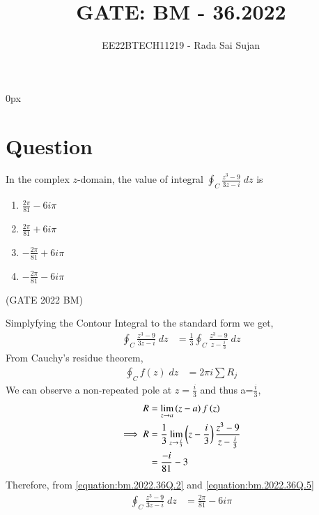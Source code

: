 \documentclass[journal,12pt,twocolumn]{IEEEtran}
\theoremstyle{remark}
\begin{document}
\parindent 0px

\title{GATE: BM - 36.2022}
\author{EE22BTECH11219 - Rada Sai Sujan$^{}$%
}
\maketitle
\newpage
\bigskip
\section*{Question}
In the complex $z$-domain, the value of integral $\oint_{C}\frac{z^3-9}{3z-i}\;dz$ is   \\
\begin{enumerate}[label=(\alph*)]
    \item $\frac{2\pi}{81}-6i\pi$ 
    \item $\frac{2\pi}{81}+6i\pi$ 
    \item $-\frac{2\pi}{81}+6i\pi$ 
    \item $-\frac{2\pi}{81}-6i\pi$ 
\end{enumerate} \hfill(GATE 2022 BM)    \\
\solution

Simplyfying the Contour Integral to the standard form we get,
\begin{align}
    \oint_{C}\frac{z^3-9}{3z-i}\;dz &= \frac{1}{3}\oint_{C}\frac{z^3-9}{z-\frac{i}{3}}\;dz
\end{align}
From Cauchy's residue theorem,
\begin{align}
    \oint_{C}f(z)\;dz &= 2\pi i\sum R_j \label{equation:bm.2022.36Q.2}
\end{align}
We can observe a non-repeated pole at $z=\frac{i}{3}$ and thus a=$\frac{i}{3}$,
\begin{align}
    R &= \lim\limits_{z\to a}\left(z-a\right)f\left(z\right)    \\
    \implies R &= \frac{1}{3}\lim\limits_{z\to \frac{i}{3}}\left(z-\frac{i}{3}\right)\frac{z^3-9}{z-\frac{i}{3}}  \\
    &= \frac{-i}{81}-3  \label{equation:bm.2022.36Q.5}
\end{align}
Therefore, from \eqref{equation:bm.2022.36Q.2} and \eqref{equation:bm.2022.36Q.5}
\begin{align}
    \oint_{C}\frac{z^3-9}{3z-i}\;dz &= \frac{2\pi}{81}-6i\pi
\end{align}
\end{document}

